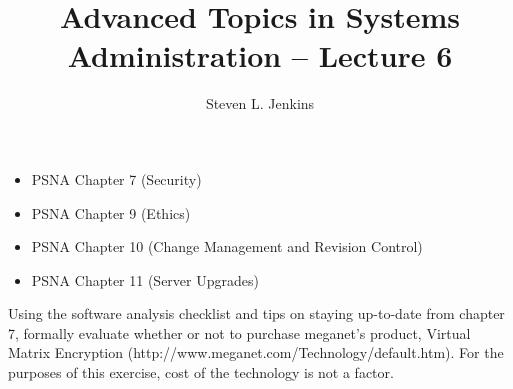 \documentclass{slides}
\title{Advanced Topics in Systems Administration -- Lecture 6}
\author{Steven L. Jenkins}
\newcommand{\bi}{\begin{itemize}}
\newcommand{\ei}{\end{itemize}}
\begin{document}
\maketitle


\bi
\item PSNA Chapter 7 (Security)
\item PSNA Chapter 9 (Ethics)
\item PSNA Chapter 10 (Change Management and Revision Control)
\item PSNA Chapter 11 (Server Upgrades)
\ei

Using the software analysis checklist and
tips on staying up-to-date from
chapter 7,
formally evaluate whether or not to purchase meganet's product,
Virtual Matrix Encryption (http://www.meganet.com/Technology/default.htm).
For the purposes of this exercise, cost of the technology is not a 
factor.
\end{document}
